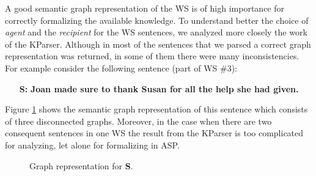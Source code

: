 A good semantic graph representation of the WS is of high importance for correctly formalizing the available knowledge. To understand better the choice of \textit{agent} and the \textit{recipient} for the WS sentences, we analyzed more closely the work of the KParser. Although in most of the sentences that we parsed a correct graph representation was returned, in some of them there were many inconsistencies. For example consider the following sentence (part of WS \#3):\\ 
\begin{itemize}
	\item[\textbf{S:}] \textbf{Joan made sure to thank Susan for all the help she had given.}
\end{itemize}
Figure \ref{Disc} shows the semantic graph representation of this sentence which consists of three disconnected graphs. Moreover, in the case when there are two consequent sentences in one WS the result from the KParser is too complicated for analyzing, let alone for formalizing in ASP. 

\begin{figure} 
	\centering
	
	\caption{\label{Disc} Graph representation for \textbf{S}.}
\end{figure}
